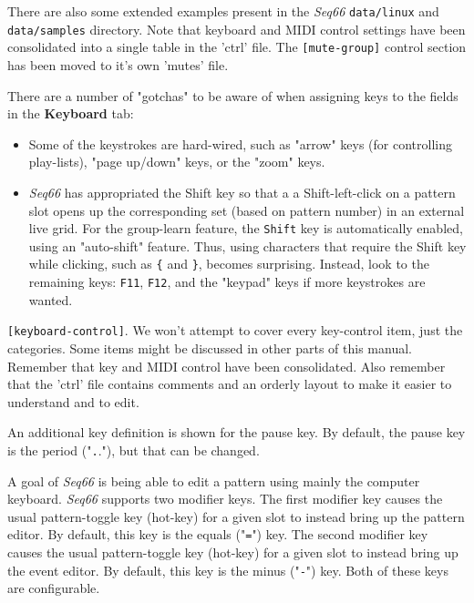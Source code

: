    There are also some extended examples present in the \textsl{Seq66}
   \texttt{data/linux} and
   \texttt{data/samples} directory.
   Note that keyboard and MIDI control settings have been consolidated
   into a single table in the 'ctrl' file.
   The \texttt{[mute-group]} control
   section has been moved to it's own 'mutes' file.

   There are a number of "gotchas" to be aware of when assigning keys to the
   fields in the \textbf{Keyboard} tab:

   \begin{itemize}
      \item Some of the keystrokes are hard-wired, such as 
         "arrow" keys (for controlling play-lists), "page up/down" keys, or
         the "zoom" keys.
      \item \textsl{Seq66} has appropriated the
          Shift key so that a a Shift-left-click on a pattern
         slot opens up the corresponding set (based on pattern number)
         in an external live grid.
         For the group-learn feature, the \texttt{Shift} key is 
         automatically enabled, using an "auto-shift" feature.
         Thus, using characters that require the Shift
         key while clicking, such as \texttt{\{} and \texttt{\}},
         becomes surprising.
         Instead, look to the remaining keys: \texttt{F11}, \texttt{F12},
         and the "keypad" keys if more keystrokes are wanted.
   \end{itemize}

   \texttt{[keyboard-control]}.
   We won't attempt to cover every key-control item,
   just the categories.  Some items might be discussed in other parts
   of this manual. Remember that key and MIDI control have been consolidated.
   Also remember that the 'ctrl' file contains comments and an orderly layout
   to make it easier to understand and to edit.

   An additional key definition is shown for the pause key.
   By default, the pause key is the period
   ("\texttt{.}."), but that can be changed.

   A goal of \textsl{Seq66} is being able to edit a pattern using mainly the
   computer keyboard.
   \textsl{Seq66} supports two modifier keys.
   The first modifier key causes the usual pattern-toggle key (hot-key) for a
   given slot to instead bring up the pattern editor.  By default, this key is
   the equals ("\texttt{=}") key.
   The second modifier key causes the usual
   pattern-toggle key (hot-key) for a given slot to instead bring up the event
   editor.  By default, this key is the minus ("\texttt{-}") key.
   Both of these keys are configurable.

